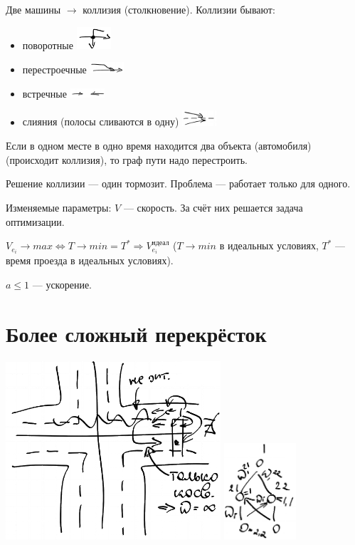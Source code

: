 \documentclass{article}
\begin{document}
Две машины $\rightarrow$ коллизия (столкновение). Коллизии бывают:
\begin{itemize}
    \item поворотные \includegraphics[width=0.1\textwidth]{graphics/pic03.png}
    \item перестроечные \includegraphics[width=0.1\textwidth]{graphics/pic04.png}
    \item встречные \includegraphics[width=0.1\textwidth]{graphics/pic05.png}
    \item слияния (полосы сливаются в одну) \includegraphics[width=0.1\textwidth]{graphics/pic06.png}
\end{itemize}

Если в одном месте в одно время находится два объекта (автомобиля) (происходит коллизия), то граф пути надо перестроить.

Решение коллизии — один тормозит. Проблема — работает только для одного.

Изменяемые параметры: $V$ — скорость. За счёт них решается задача оптимизации.

$V_{e_i} \rightarrow max \Leftrightarrow T \rightarrow min = T^* \Rightarrow V_{e_i}^{\text{идеал}}$ ($T \rightarrow min$ в идеальных условиях, $T^*$ — время проезда в идеальных условиях).

$a \leq 1$ — ускорение.

\section*{Более сложный перекрёсток}

\includegraphics[width=0.6\textwidth]{graphics/pic07.png} \includegraphics[width=0.2\textwidth]{graphics/pic08.png}
\end{document}
